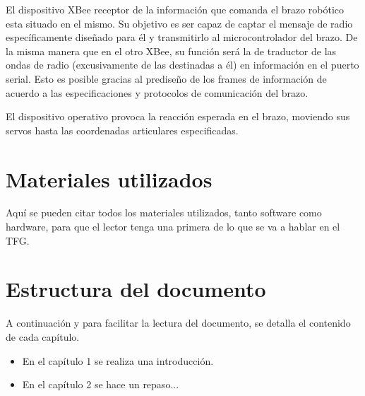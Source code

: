 El dispositivo XBee receptor de la información que comanda el brazo robótico esta situado en el mismo. Su objetivo es ser capaz de captar el mensaje de radio específicamente diseñado para él y transmitirlo al microcontrolador del brazo. De la misma manera que en el otro XBee, su función será la de traductor de las ondas de radio (excusivamente de las destinadas a él) en información en el puerto serial. Esto es posible gracias al prediseño de los frames de información de acuerdo a las especificaciones y protocolos de comunicación del brazo.

El dispositivo operativo provoca la reacción esperada en el brazo, moviendo sus servos hasta las coordenadas articulares especificadas.

\section{Materiales utilizados}

Aquí se pueden citar todos los materiales utilizados, tanto software como hardware, para que el lector tenga una primera de lo que se va a hablar en el TFG.

\section{Estructura del documento}

A continuación y para facilitar la lectura del documento, se detalla el contenido de cada capítulo.

\begin{itemize}
\item En el capítulo 1 se realiza una introducción.
\item En el capítulo 2 se hace un repaso...
\end{itemize}
